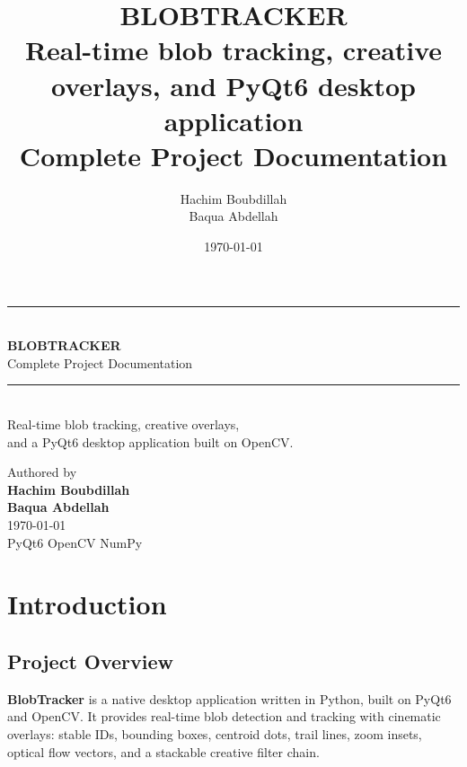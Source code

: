 \documentclass[11pt,a4paper,openany]{report}
\title{
    \vspace{2.5cm}
    {\sffamily\Huge\bfseries\color{btAccentDark} BLOBTRACKER}\\[0.4cm]
    {\sffamily\Large\textcolor{btMuted}{Real-time blob tracking, creative overlays, and PyQt6 desktop application}}\\[1.2cm]
    {\large\sffamily Complete Project Documentation}
}
\author{
    {\large Hachim Boubdillah} \\[0.2em]
    {\large Baqua Abdellah}
}
\date{\today}
\begin{document}

\begin{titlepage}
    \centering
    \vspace*{2cm}

    {\color{btAccentDark}\rule{0.6\linewidth}{1.5pt}}\\[0.6cm]
    {\sffamily\Huge\bfseries\color{btAccentDark} BLOBTRACKER}\\[0.4cm]
    {\sffamily\Large\textcolor{btMuted}{Complete Project Documentation}}\\[0.3cm]
    {\color{btAccentDark}\rule{0.6\linewidth}{1.5pt}}\\[2cm]

    {\sffamily\large
    Real-time blob tracking, creative overlays,\\
    and a PyQt6 desktop application built on OpenCV.\\[2cm]}

    {\sffamily\normalsize\textcolor{btMuted}{Authored by}}\\[0.4cm]
    {\sffamily\Large\bfseries Hachim Boubdillah}\\[0.2cm]
    {\sffamily\Large\bfseries Baqua Abdellah}\\[3cm]

    \vfill
    {\sffamily\small\textcolor{btMuted}{\today}}\\[0.4cm]
    {\sffamily\footnotesize\textcolor{btMuted}{PyQt6 \textbullet{} OpenCV \textbullet{} NumPy}}
\end{titlepage}

\tableofcontents
\clearpage
{}

\chapter{Introduction}

\section{Project Overview}

\textbf{BlobTracker} is a native desktop application written in Python, built
on PyQt6 and OpenCV. It provides real-time blob detection and tracking with
cinematic overlays: stable IDs, bounding boxes, centroid dots, trail lines,
zoom insets, optical flow vectors, and a stackable creative filter chain.
\end{document}

